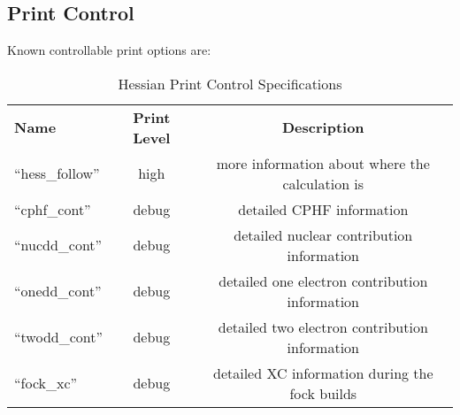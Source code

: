 \subsection{Print Control} 
Known controllable print options are:

\begin{table}[h]
\begin{center}
\begin{tabular}{lcc}
  {\bf Name}          & {\bf Print Level} & {\bf Description} \\
 ``hess\_follow''               & high        & more information about where the calculation is \\
 ``cphf\_cont''                 & debug       & detailed CPHF information \\
 ``nucdd\_cont''                & debug       & detailed nuclear contribution information \\
 ``onedd\_cont''                & debug       & detailed one electron contribution information \\
 ``twodd\_cont''                & debug       & detailed two electron contribution information \\
 ``fock\_xc''                   & debug       & detailed XC information during the fock builds \\
\end{tabular}
\end{center}
\caption{Hessian Print Control Specifications}
\end{table}




